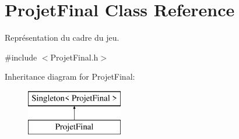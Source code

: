 \hypertarget{class_projet_final}{}\section{Projet\+Final Class Reference}
\label{class_projet_final}


Représentation du cadre du jeu.  




{\ttfamily \#include $<$Projet\+Final.\+h$>$}

Inheritance diagram for Projet\+Final\+:\begin{figure}[H]
\begin{center}
\leavevmode
\includegraphics[height=2.000000cm]{class_projet_final}
\end{center}
\end{figure}
